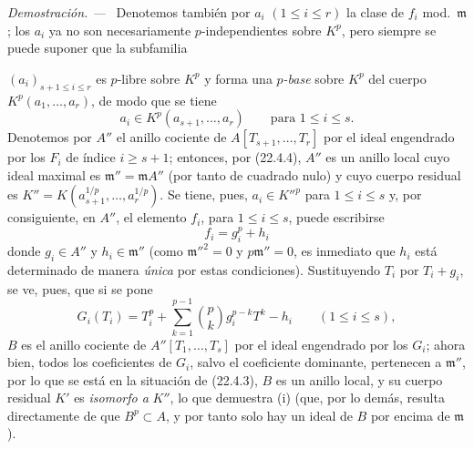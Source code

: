 \documentclass[10pt,oneside]{book}
\newcommand{\oldpage}[2][]{%
  \setcounter{footnote}{0}%
  \marginpar{\scriptsize\textbf{#1}~|~#2}\ignorespaces}
\newenvironment{proof}{%
  \par\medskip\noindent\textit{Demostración. ---\ }}{\par}
\providecommand{\setmin}{-}%
\begin{document}
\begin{proof}
Denotemos también por $a_i$ $(1\leqslant i\leqslant r)$ la clase de $f_i$
mod.~$\mathfrak m$; los $a_i$ ya no son necesariamente $p$-independientes
sobre $K^p$, pero siempre se puede suponer que la subfamilia

\oldpage[0\textsubscript{IV-1}]{199}

$(a_i)_{s+1\leqslant i\leqslant r}$ es $p$-libre sobre $K^p$ y forma una
\emph{$p$-base} sobre $K^p$ del cuerpo $K^p(a_1,\ldots,a_r)$, de modo que se tiene
\[
  a_i\in K^p(a_{s+1},\ldots,a_r)\qquad\text{para }1\leqslant i\leqslant s.
\]
Denotemos por $A''$ el anillo cociente de $A[T_{s+1},\ldots,T_r]$ por el ideal
engendrado por los $F_i$ de índice $i\geqslant s+1$; entonces, por (22.4.4), $A''$
es un anillo local cuyo ideal maximal es $\mathfrak m''=\mathfrak mA''$
(por tanto de cuadrado nulo) y cuyo cuerpo residual es
$K''=K(a_{s+1}^{1/p},\ldots,a_r^{1/p})$. Se tiene, pues,
$a_i\in K''^p$ para $1\leqslant i\leqslant s$ y, por consiguiente, en $A''$,
el elemento $f_i$, para $1\leqslant i\leqslant s$, puede escribirse
\begin{equation}
\label{0.22.4.7.3-es}
  f_i=g_i^p+h_i
  \tag{22.4.7.3}
\end{equation}
donde $g_i\in A''$ y $h_i\in\mathfrak m''$ (como $\mathfrak m''^2=0$ y
$p\mathfrak m''=0$, es inmediato que $h_i$ está determinado de manera
\emph{única} por estas condiciones). Sustituyendo $T_i$ por $T_i+g_i$, se ve, pues,
que si se pone
\[
  G_i(T_i)=T_i^p+\sum_{k=1}^{p-1}\binom pk g_i^{p-k}T^k\setmin h_i
  \qquad(1\leqslant i\leqslant s),
\]
$B$ es el anillo cociente de $A''[T_1,\ldots,T_s]$ por el ideal engendrado por los
$G_i$; ahora bien, todos los coeficientes de $G_i$, salvo el coeficiente dominante,
pertenecen a $\mathfrak m''$, por lo que se está en la situación de (22.4.3),
$B$ es un anillo local, y su cuerpo residual $K'$ es \emph{isomorfo a}
$K''$, lo que demuestra (i) (que, por lo demás, resulta directamente de que
$B^p\subset A$, y por tanto solo hay un ideal de $B$ por encima de
$\mathfrak m$).


\end{proof}
\end{document}
